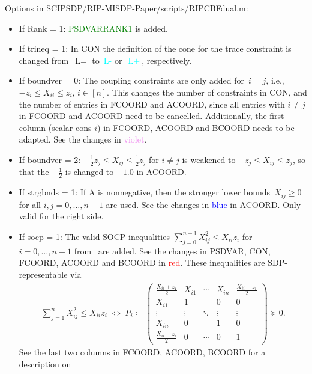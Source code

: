 \documentclass[11pt,a4paper]{article}
\newcommand{\define}{\coloneqq}
\theoremstyle{definition}
\begin{document}
Options in \textsf{SCIPSDP/RIP-MISDP-Paper/scripts/RIPCBFdual.m}:
\begin{itemize}
\item If Rank = 1: \textcolor{green}{PSDVARRANK1} is added.
\item If trineq = 1: In CON the definition of the cone for the trace
  constraint is changed from~$\text{L}=$ to~\textcolor{cyan}{$\text{L-}$}
  or~\textcolor{cyan}{$\text{L}+$}, respectively.
\item If boundver = 0: The coupling constraints are only added for~$i = j$,
  i.e., {\color{violet} $-z_i \leq X_{ii} \leq z_i$, $i \in [n]$}. This
  changes the number of constraints in CON, and the number of entries in
  FCOORD and ACOORD, since all entries with $i \neq j$ in FCOORD and ACOORD
  need to be cancelled. Additionally, the first column (scalar cons $i$) in
  FCOORD, ACOORD and BCOORD needs to be adapted. See the changes in
  \textcolor{violet}{violet}.
\item If boundver = 2: {\color{orange}
    $-\tfrac{1}{2}z_j \leq X_{ij} \leq \tfrac{1}{2}z_j$ for $i \neq j$} is
  weakened to {\color{orange}$-z_j \leq X_{ij} \leq z_j$}, so that the
  {\color{orange} $-\tfrac{1}{2}$} is changed to $-1.0$ in ACOORD.
\item If strgbnds = 1: If A is nonnegative, then the stronger lower
  bounds~$X_{ij} \geq 0$ for all $i,j =0,\dots,n-1$ are used. See the
  changes in \textcolor{blue}{blue} in ACOORD. Only valid for the right
  side.
\item If socp = 1: The valid SOCP inequalities
  $\sum_{j=0}^{n-1}X_{ij}^2 \leq X_{ii}z_i$ for $i = 0,\dots,n-1$
  from~\cite{LiX20} are added. See the changes in PSDVAR, CON, FCOORD,
  ACOORD and BCOORD in \textcolor{red}{red}. These inequalities are
  SDP-representable via
  \begin{align*}
    \sum_{j=1}^n X_{ij}^2 \leq X_{ii}z_i \; \Leftrightarrow \;
    P_i \define \begin{pmatrix}
      \tfrac{X_{ii}+z_I}{2} & X_{i1} & \cdots & X_{in} & \tfrac{X_{ii}-z_i}{2}
      \\
      X_{i1} & 1 & & 0 & 0 \\
      \vdots &\vdots & \ddots & \vdots & \vdots \\
      X_{in} & 0 & & 1 & 0 \\
      \tfrac{X_{ii}-z_i}{2} & 0 & \cdots & 0 & 1
    \end{pmatrix} \succeq 0.
  \end{align*}
  See the last two columns in FCOORD, ACOORD, BCOORD for a description on

\end{itemize}
\end{document}
